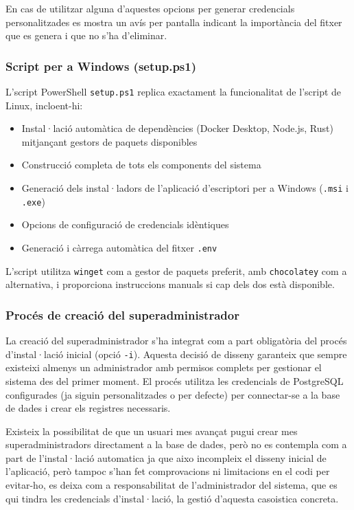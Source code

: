 En cas de utilitzar alguna d'aquestes opcions per generar credencials personalitzades es mostra un avís per pantalla indicant la importància del fitxer que es genera i que no s'ha d'eliminar.

\subsubsection{Script per a Windows (setup.ps1)}

L'script PowerShell \texttt{setup.ps1} replica exactament la funcionalitat de l'script de Linux, incloent-hi:

\begin{itemize}
  \item Instal·lació automàtica de dependències (Docker Desktop, Node.js, Rust) mitjançant gestors de paquets disponibles
  \item Construcció completa de tots els components del sistema
  \item Generació dels instal·ladors de l'aplicació d'escriptori per a Windows (\texttt{.msi} i \texttt{.exe})
  \item Opcions de configuració de credencials idèntiques
  \item Generació i càrrega automàtica del fitxer \texttt{.env}
\end{itemize}

L'script utilitza \texttt{winget} com a gestor de paquets preferit, amb \texttt{chocolatey} com a alternativa, i proporciona instruccions manuals si cap dels dos està disponible.

\subsubsection{Procés de creació del superadministrador}

La creació del superadministrador s'ha integrat com a part obligatòria del procés d'instal·lació inicial (opció \texttt{-i}). Aquesta decisió de disseny garanteix que sempre existeixi almenys un administrador amb permisos complets per gestionar el sistema des del primer moment. El procés utilitza les credencials de PostgreSQL configurades (ja siguin personalitzades o per defecte) per connectar-se a la base de dades i crear els registres necessaris.

Existeix la possibilitat de que un usuari mes avançat pugui crear mes superadministradors directament a la base de dades, però no es contempla com a part de l'instal·lació automatica ja que aixo incompleix el disseny inicial de l'aplicació, però tampoc s'han fet comprovacions ni limitacions en el codi per evitar-ho, es deixa com a responsabilitat de l'administrador del sistema, que es qui tindra les credencials d'instal·lació, la gestió d'aquesta casoistica concreta.

